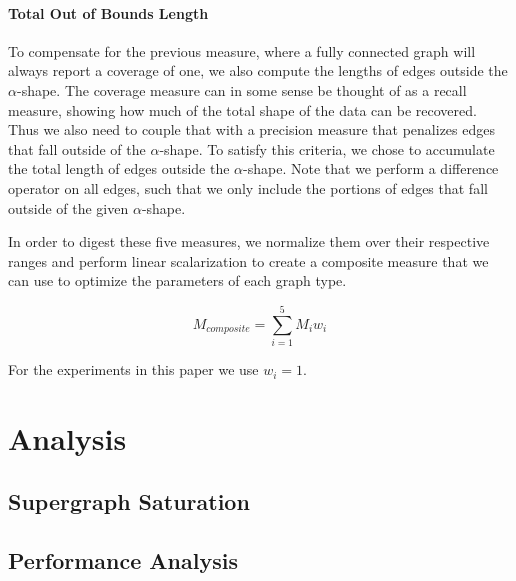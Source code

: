 \paragraph{\textbf{Total Out of Bounds Length}} To compensate for the previous measure, where a fully connected graph will always report a coverage of one, we also compute the lengths of edges outside the $\alpha$-shape.
%
%
The coverage measure can in some sense be thought of as a recall measure, showing how much of the total shape of the data can be recovered.
%
Thus we also need to couple that with a precision measure that penalizes edges that fall outside of the $\alpha$-shape.
%
To satisfy this criteria, we chose to accumulate the total length of edges outside the $\alpha$-shape.
%
Note that we perform a difference operator on all edges, such that we only include the portions of edges that fall outside of the given $\alpha$-shape.


In order to digest these five measures, we normalize them over their respective ranges and perform linear scalarization to create a composite measure that we can use to optimize the parameters of each graph type.

\begin{equation}
    M_{composite} = \sum_{i=1}^5 M_iw_i
\end{equation}

For the experiments in this paper we use $w_i=1$.

\section{Analysis}


\subsection{Supergraph Saturation}


\subsection{Performance Analysis}

